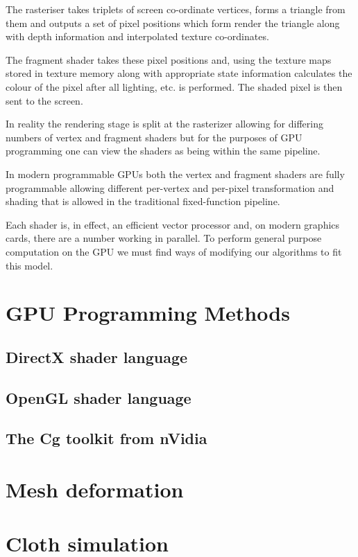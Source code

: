 The rasteriser takes triplets of screen co-ordinate vertices, forms
a triangle from them and outputs a set of pixel positions which form
render the triangle along with depth information and interpolated texture
co-ordinates. 

The fragment shader takes these pixel positions and, using the texture maps
stored in texture memory along with appropriate state information calculates
the colour of the pixel after all lighting, etc. is performed. The shaded pixel
is then sent to the screen.

In reality the rendering stage is split at the rasterizer allowing for differing
numbers of vertex and fragment shaders but for the purposes of GPU programming
one can view the shaders as being within the same pipeline.

In modern programmable GPUs both the vertex and fragment shaders are fully 
programmable allowing different per-vertex and per-pixel transformation
and shading that is allowed in the traditional fixed-function pipeline.

Each shader is, in effect, an efficient vector processor and, on modern 
graphics cards, there are a number working in parallel. To perform
general purpose computation on the GPU we must find ways of modifying our
algorithms to fit this model.

\section{GPU Programming Methods}

\subsection{DirectX shader language}

\cite{GPU:DirectX,GPU:DirectXShadingLanguage}

\subsection{OpenGL shader language}

\cite{GPU:OpenGLSpec,GPU:OpenGLShadingLanguage}

\subsection{The Cg toolkit from nVidia}

\cite{nvidia:cgtoolkit,nvidia:sm3unleashed}

\section{Mesh deformation}

\section{Cloth simulation}
